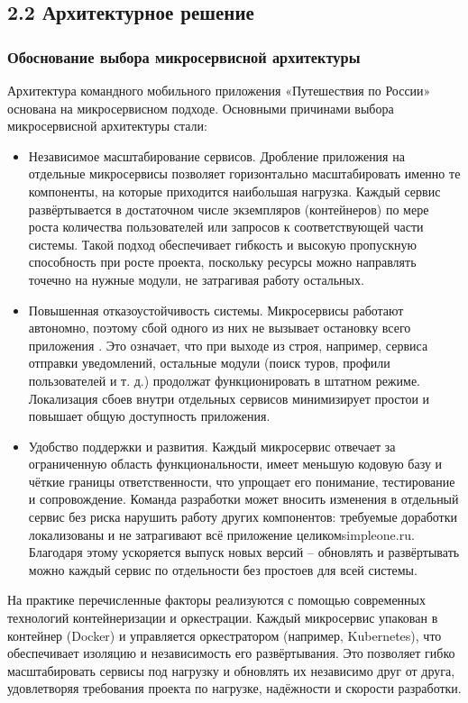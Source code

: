 \noindent \subsection*{2.2 Архитектурное решение}

\noindent \subsubsection*{Обоснование выбора микросервисной архитектуры}
Архитектура командного мобильного приложения «Путешествия по России» основана на микросервисном подходе. Основными причинами выбора микросервисной архитектуры стали:
\begin{itemize}
    \item Независимое масштабирование сервисов. Дробление приложения на отдельные микросервисы позволяет горизонтально масштабировать именно те компоненты, на которые приходится наибольшая нагрузка. Каждый сервис развёртывается в достаточном числе экземпляров (контейнеров) по мере роста количества пользователей или запросов к соответствующей части системы. Такой подход обеспечивает гибкость и высокую пропускную способность при росте проекта, поскольку ресурсы можно направлять точечно на нужные модули, не затрагивая работу остальных.
    \item Повышенная отказоустойчивость системы. Микросервисы работают автономно, поэтому сбой одного из них не вызывает остановку всего приложения \cite{6}. Это означает, что при выходе из строя, например, сервиса отправки уведомлений, остальные модули (поиск туров, профили пользователей и т. д.) продолжат функционировать в штатном режиме. Локализация сбоев внутри отдельных сервисов минимизирует простои и повышает общую доступность приложения.
    \item Удобство поддержки и развития. Каждый микросервис отвечает за ограниченную область функциональности, имеет меньшую кодовую базу и чёткие границы ответственности, что упрощает его понимание, тестирование и сопровождение. Команда разработки может вносить изменения в отдельный сервис без риска нарушить работу других компонентов: требуемые доработки локализованы и не затрагивают всё приложение целикомsimpleone.ru. Благодаря этому ускоряется выпуск новых версий – обновлять и развёртывать можно каждый сервис по отдельности без простоев для всей системы.
\end{itemize}
\noindent На практике перечисленные факторы реализуются с помощью современных технологий контейнеризации и оркестрации. Каждый микросервис упакован в контейнер (Docker) и управляется оркестратором (например, Kubernetes), что обеспечивает изоляцию и независимость его развёртывания. Это позволяет гибко масштабировать сервисы под нагрузку и обновлять их независимо друг от друга, удовлетворяя требования проекта по нагрузке, надёжности и скорости разработки.

